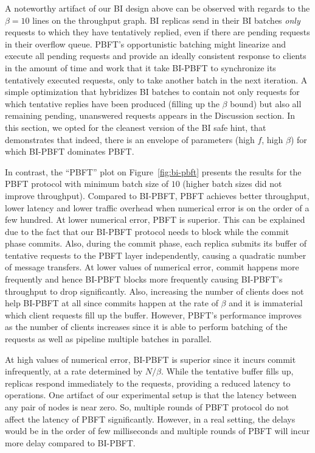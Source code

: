 \documentclass[twocolumn,10pt]{article}
\begin{document}
A noteworthy artifact of our BI design above can be observed with
regards to the $\beta = 10$ lines on the throughput graph.  BI replicas
send in their BI batches
\emph{only} requests to which they have tentatively replied, even if
there are pending requests in their overflow queue.  PBFT's
opportunistic batching might linearize and execute all pending requests and provide an
ideally consistent response to clients in the amount of time and work
that it take BI-PBFT to synchronize its tentatively executed requests,
only to take another batch in the next iteration.  A simple
optimization that hybridizes BI batches to contain not only requests for
which tentative replies have been produced (filling up the $\beta$
bound) but also all remaining pending, unanswered requests appears in
the Discussion section. In this section, we opted for the cleanest
version of the BI safe hint, that demonstrates that indeed, there is an
envelope of parameters (high $f$, high $\beta$) for which BI-PBFT
dominates PBFT.

In contrast, the ``PBFT'' plot on Figure~\ref{fig:bi-pbft} presents the
results for the PBFT protocol with minimum batch size of $10$ (higher
batch sizes did not improve throughput). Compared to BI-PBFT, PBFT achieves better throughput, lower
latency and lower traffic overhead when numerical error is on the order
of a few hundred. At lower
numerical error, PBFT is superior. This can be explained due to the fact that our BI-PBFT protocol 
needs to block while the commit phase commits. Also, during the commit phase, each replica
submits its buffer of tentative requests to the PBFT layer independently, causing a quadratic number
of message transfers. At lower values of numerical error, commit happens more frequently and hence
BI-PBFT blocks more frequently causing BI-PBFT's throughput to drop significantly. Also, increasing
the number of clients does not help BI-PBFT at all since commits happen at the rate of $\beta$ and
it is immaterial which client requests fill up the buffer. However, PBFT's performance improves as
the number of clients increases since it is able to perform batching of the requests as well
as pipeline multiple batches in parallel. 

At high values of numerical error, BI-PBFT is superior since it incurs commit infrequently, at a rate
determined by $N/\beta$. While the tentative buffer fills up, replicas respond immediately to the
requests, providing a reduced latency to operations. One artifact of our experimental setup is that 
the latency between any pair of nodes is near zero. So, multiple rounds of PBFT protocol do not affect the
latency of PBFT significantly. However, in a real setting, the delays would be in the order of few
milliseconds and multiple rounds of PBFT will incur more delay compared to BI-PBFT.
\end{document}
